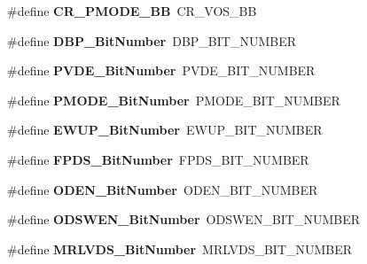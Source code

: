 \begin{DoxyCompactItemize}
\#define {\bfseries C\+R\+\_\+\+P\+M\+O\+D\+E\+\_\+\+BB}~C\+R\+\_\+\+V\+O\+S\+\_\+\+BB
\item 
\mbox{\label{group___h_a_l___p_w_r___aliased_ga36ff45d972bf94f31f172fd53cf44d23}} 
\#define {\bfseries D\+B\+P\+\_\+\+Bit\+Number}~D\+B\+P\+\_\+\+B\+I\+T\+\_\+\+N\+U\+M\+B\+ER
\item 
\mbox{\label{group___h_a_l___p_w_r___aliased_ga17d618eb800c401ef9c6789c9374eaf8}} 
\#define {\bfseries P\+V\+D\+E\+\_\+\+Bit\+Number}~P\+V\+D\+E\+\_\+\+B\+I\+T\+\_\+\+N\+U\+M\+B\+ER
\item 
\mbox{\label{group___h_a_l___p_w_r___aliased_ga15fea9df1b0d324394336f70b319b377}} 
\#define {\bfseries P\+M\+O\+D\+E\+\_\+\+Bit\+Number}~P\+M\+O\+D\+E\+\_\+\+B\+I\+T\+\_\+\+N\+U\+M\+B\+ER
\item 
\mbox{\label{group___h_a_l___p_w_r___aliased_ga94fe0520e8f9b71fa2b99c0565ec70ea}} 
\#define {\bfseries E\+W\+U\+P\+\_\+\+Bit\+Number}~E\+W\+U\+P\+\_\+\+B\+I\+T\+\_\+\+N\+U\+M\+B\+ER
\item 
\mbox{\label{group___h_a_l___p_w_r___aliased_gad99a3da921e3e64587f6b9505ecba665}} 
\#define {\bfseries F\+P\+D\+S\+\_\+\+Bit\+Number}~F\+P\+D\+S\+\_\+\+B\+I\+T\+\_\+\+N\+U\+M\+B\+ER
\item 
\mbox{\label{group___h_a_l___p_w_r___aliased_ga2f24ddbcbc5b8d74c0b032cfa53c725a}} 
\#define {\bfseries O\+D\+E\+N\+\_\+\+Bit\+Number}~O\+D\+E\+N\+\_\+\+B\+I\+T\+\_\+\+N\+U\+M\+B\+ER
\item 
\mbox{\label{group___h_a_l___p_w_r___aliased_gaf2e21cacf95f557d2535d623c41577c2}} 
\#define {\bfseries O\+D\+S\+W\+E\+N\+\_\+\+Bit\+Number}~O\+D\+S\+W\+E\+N\+\_\+\+B\+I\+T\+\_\+\+N\+U\+M\+B\+ER
\item 
\mbox{\label{group___h_a_l___p_w_r___aliased_ga50e53827046644c175fe431eea5f4261}} 
\#define {\bfseries M\+R\+L\+V\+D\+S\+\_\+\+Bit\+Number}~M\+R\+L\+V\+D\+S\+\_\+\+B\+I\+T\+\_\+\+N\+U\+M\+B\+ER
\item 

\end{DoxyCompactItemize}
